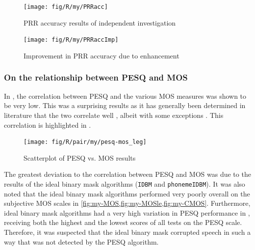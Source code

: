 \begin{figure}[h]
\noindent \begin{centering}
\texttt{[image: fig/R/my/PRRacc]}
\par\end{centering}

\protect\caption{\label{fig:my-PRRacc}\acs{PRR} accuracy results of independent investigation}
\end{figure}


\begin{figure}[h]
\noindent \begin{centering}
\texttt{[image: fig/R/my/PRRaccImp]}
\par\end{centering}

\protect\caption{\label{fig:my-PRRacc-imp}Improvement in \acs{PRR} accuracy due to
enhancement}
\end{figure}


\clearpage{}


\subsubsection*{On the relationship between \acs{PESQ} and \acs{MOS}}

In , the correlation between \ac{PESQ} and the various
\ac{MOS} measures was shown to be very low. This was a surprising
results as it has generally been determined in literature that the
two correlate well \citep{Kitawaki2007,Rix2003,Rix2001}, albeit with
some exceptions \citep{Liu2006}. This correlation is highlighted
in .

\begin{figure}[bh]

\texttt{[image: fig/R/pair/my/pesq-mos\_leg]}

\protect\caption{\label{fig:my-pesq-mos}Scatterplot of \acs{PESQ} vs. \acs{MOS}
results}
\end{figure}


The greatest deviation to the correlation between \ac{PESQ} and \ac{MOS}
was due to the results of the ideal binary mask algorithms (\lstinline!IDBM!
and \lstinline!phonemeIDBM!). It was also noted that the ideal binary
mask algorithms performed very poorly overall on the subjective \ac{MOS}
scales in \cref{fig:my-MOS,fig:my-MOSle,fig:my-CMOS}. Furthermore,
ideal binary mask algorithms had a very high variation in \ac{PESQ}
performance in , receiving both the highest and the
lowest scores of all tests on the \ac{PESQ} scale. Therefore, it
was suspected that the ideal binary mask corrupted speech in such
a way that was not detected by the \ac{PESQ} algorithm.

